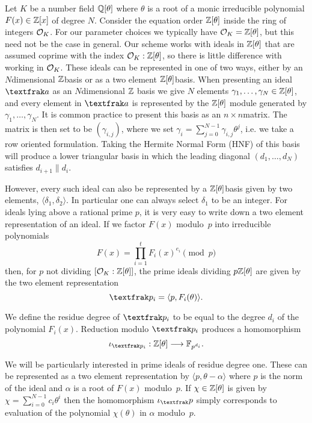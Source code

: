 Let $K$ be a number field $\mathbb{Q}[\theta]$ where $\theta$ is a root of a monic irreducible polynomial $F(x) \in \mathbb{Z}[x]$ of degree $N$.
Consider the equation order $\mathbb{Z}[\theta]$ inside the ring of integers $\mathcal{O}_K$.
For our parameter choices we typically have $\mathcal{O}_K = \mathbb{Z}[\theta]$, but this need not be the case in general.
Our scheme works with ideals in $\mathbb{Z}[\theta]$ that are assumed coprime with the index $\mathcal{O}_K: \mathbb{Z}[\theta]$, so there is little difference with working in $\mathcal{O}_K$.
These ideals can be represented in one of two ways, either by an $N$\ndash dimensional $\mathbb{Z}$\ndash basis or as a two element $\mathbb{Z}[\theta]$\ndash basis.
When presenting an ideal $\tfr{a}$ as an $N$\ndash dimensional $\mathbb{Z}$ basis we give $N$ elements $\gamma_1, \ldots, \gamma_N \in \mathbb{Z}[\theta]$, and every element in $\tfr{a}$ is represented by the $\mathbb{Z}[\theta]$ \ndash module generated by $\gamma_1, \ldots, \gamma_N$.
It is common practice to present this basis as an $n \times n$\ndash matrix.
The matrix is then set to be $(\gamma_{i, j})$, where we set $\gamma_i = \sum_{j=0}^{N-1}{\gamma_{i, j}\theta^j}$, i.e. we take a row oriented formulation. 
Taking the Hermite Normal Form (HNF) of this basis will
produce a lower triangular basis in which the leading diagonal $(d_1, \ldots, d_N)$ satisfies $d_{i+1}\|d_i$.

However, every such ideal can also be represented by a $\mathbb{Z}[\theta]$\ndash basis given by two elements, $\langle \delta_1, \delta_2 \rangle$.
In particular one can always select $\delta_1$ to be an integer.
For ideals lying above a rational prime $p$, it is very easy to write down a two element representation of an ideal.
If we factor $F(x)$ modulo~$p$ into irreducible	polynomials
\[
F(x) = {\prod_{i=1}^{t}{F_i(x)^{e_i}}}\pmod{p}
\]
then, for $p$ not dividing $[\mathcal{O}_K: \mathbb{Z}[\theta]]$, the prime ideals dividing $p\mathbb{Z}[\theta]$ are given by the two element representation
\[
\tfr{p}_i = \langle p,F_i(\theta) \rangle.
\]

We define the residue degree of $\tfr{p}_i$ to be equal to the degree $d_i$ of the polynomial $F_i(x)$.
Reduction modulo $\tfr{p}_i$ produces a homomorphism
\[
\iota_{\tfr{p}_i} : \bb{Z}[\theta] \longrightarrow \bb{F}_{p^{d_i}}.
\]

We will be particularly interested in prime ideals of residue degree one. 
These can be represented as a two element representation by $\langle p, \theta - \alpha \rangle$ where $p$ is the norm of the ideal and $\alpha$ is a root of $F(x)$ modulo~$p$.
If $\chi \in \mathbb{Z}[\theta]$ is given by $\chi = \sum_{i=0}^{N-1}{c_i \theta^i}$ then the homomorphism $\iota_\tfr{p}$ simply corresponds to evaluation of the polynomial $\chi(\theta)$ in $\alpha$ modulo~$p$.

